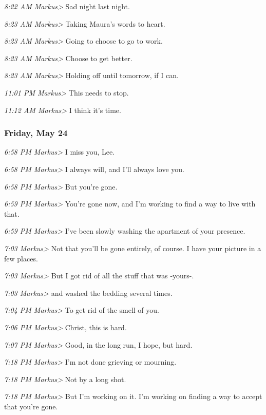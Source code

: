 {\emph{8:22 AM Markus\textgreater{}} Sad night last night.

\emph{8:23 AM Markus\textgreater{}} Taking Maura's words to heart.

\emph{8:23 AM Markus\textgreater{}} Going to choose to go to work.

\emph{8:23 AM Markus\textgreater{}} Choose to get better.

\emph{8:23 AM Markus\textgreater{}} Holding off until tomorrow, if I
can.

\emph{11:01 PM Markus\textgreater{}} This needs to stop.

\emph{11:12 AM Markus\textgreater{}} I think it's time.

\subsubsection*{Friday, May 24}\label{friday-may-24}

\emph{6:58 PM Markus\textgreater{}} I miss you, Lee.

\emph{6:58 PM Markus\textgreater{}} I always will, and I'll always love
you.

\emph{6:58 PM Markus\textgreater{}} But you're gone.

\emph{6:59 PM Markus\textgreater{}} You're gone now, and I'm working to
find a way to live with that.

\emph{6:59 PM Markus\textgreater{}} I've been slowly washing the
apartment of your presence.

\emph{7:03 Markus\textgreater{}} Not that you'll be gone entirely, of
course. I have your picture in a few places.

\emph{7:03 Markus\textgreater{}} But I got rid of all the stuff that was
-yours-.

\emph{7:03 Markus\textgreater{}} and washed the bedding several times.

\emph{7:04 PM Markus\textgreater{}} To get rid of the smell of you.

\emph{7:06 PM Markus\textgreater{}} Christ, this is hard.

\emph{7:07 PM Markus\textgreater{}} Good, in the long run, I hope, but
hard.

\emph{7:18 PM Markus\textgreater{}} I'm not done grieving or mourning.

\emph{7:18 PM Markus\textgreater{}} Not by a long shot.

\emph{7:18 PM Markus\textgreater{}} But I'm working on it. I'm working
on finding a way to accept that you're gone.

}
